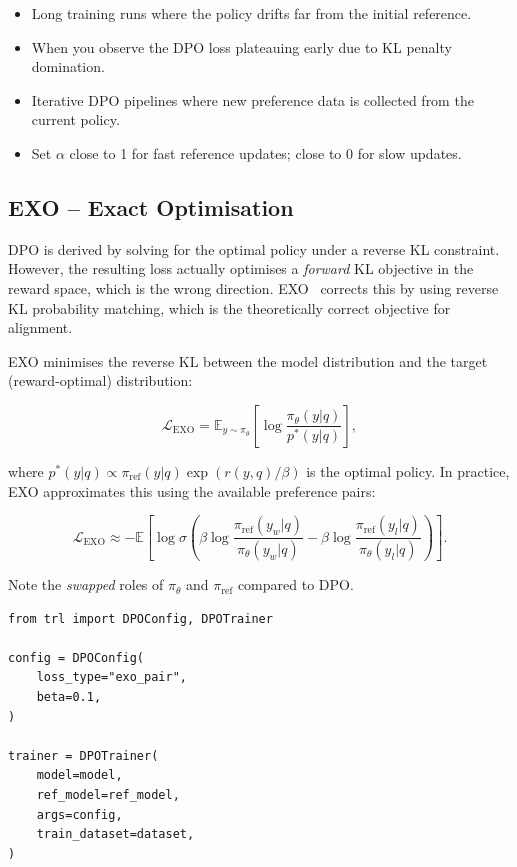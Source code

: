 \begin{keybox}
\begin{itemize}
  \item Long training runs where the policy drifts far from the initial reference.
  \item When you observe the DPO loss plateauing early due to KL penalty domination.
  \item Iterative DPO pipelines where new preference data is collected from the current policy.
  \item Set $\alpha$ close to 1 for fast reference updates; close to 0 for slow updates.
\end{itemize}
\end{keybox}

\subsection{EXO -- Exact Optimisation}
\label{sec:exo}

\begin{intuitionbox}
DPO is derived by solving for the optimal policy under a reverse KL constraint. However, the resulting loss actually optimises a \emph{forward} KL objective in the reward space, which is the wrong direction. EXO~\cite{ji2024exo} corrects this by using reverse KL probability matching, which is the theoretically correct objective for alignment.
\end{intuitionbox}

EXO minimises the reverse KL between the model distribution and the target (reward-optimal) distribution:

\[
\mathcal{L}_{\text{EXO}} = \mathbb{E}_{y \sim \pi_\theta}\!\left[
    \log \frac{\pi_\theta(y|q)}{p^*(y|q)}
  \right],
\]

where $p^*(y|q) \propto \pi_{\text{ref}}(y|q) \exp(r(y,q)/\beta)$ is the optimal policy. In practice, EXO approximates this using the available preference pairs:

\[
\mathcal{L}_{\text{EXO}} \approx -\mathbb{E}\!\left[
    \log \sigma\!\left(
      \beta \log \frac{\pi_{\text{ref}}(y_w|q)}{\pi_\theta(y_w|q)}
      - \beta \log \frac{\pi_{\text{ref}}(y_l|q)}{\pi_\theta(y_l|q)}
    \right)
  \right].
\]

Note the \emph{swapped} roles of $\pi_\theta$ and $\pi_{\text{ref}}$ compared to DPO.

\begin{examplebox}
\begin{lstlisting}[style=pythonstyle]
from trl import DPOConfig, DPOTrainer

config = DPOConfig(
    loss_type="exo_pair",
    beta=0.1,
)

trainer = DPOTrainer(
    model=model,
    ref_model=ref_model,
    args=config,
    train_dataset=dataset,
)
\end{lstlisting}
\end{examplebox}

